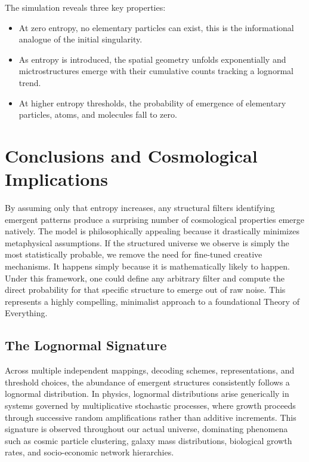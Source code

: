 The simulation reveals three key properties:
\begin{itemize}
    \item At zero entropy, no elementary particles can exist, this is the informational analogue of the initial singularity.
    \item As entropy is introduced, the spatial geometry unfolds exponentially and mictrostructures emerge with their cumulative counts tracking a lognormal trend.
    \item At higher entropy thresholds, the probability of emergence of elementary particles, atoms, and molecules fall to zero.
\end{itemize}

\section{Conclusions and Cosmological Implications}

By assuming only that entropy increases, any structural filters identifying emergent patterns produce a surprising number of cosmological properties emerge natively.
The model is philosophically appealing because it drastically minimizes metaphysical assumptions. If the structured universe we observe is simply the most statistically probable,
we remove the need for fine-tuned creative mechanisms. It happens simply because it is mathematically likely to happen. Under this framework, one could define any arbitrary filter 
and compute the direct probability for that specific structure to emerge out of raw noise. This represents a highly compelling, minimalist approach to a foundational Theory of Everything.

\subsection*{The Lognormal Signature}

Across multiple independent mappings, decoding schemes, representations, and threshold choices, the abundance of emergent structures consistently follows a lognormal distribution. 
In physics, lognormal distributions arise generically in systems governed by multiplicative stochastic processes, where growth proceeds through successive random amplifications 
rather than additive increments. This signature is observed throughout our actual universe, dominating phenomena such as cosmic particle clustering, galaxy mass distributions, 
biological growth rates, and socio-economic network hierarchies.

